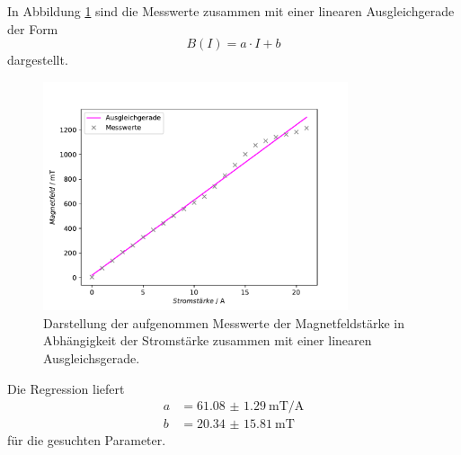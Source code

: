  In Abbildung \ref{fig:Magnetfeld} sind die Messwerte zusammen mit einer linearen Ausgleichgerade der 
 Form
 \begin{equation}
     B(I) = a \cdot I + b
 \end{equation} \noindent
 dargestellt.
 \begin{figure}[H]
     \centering
     \includegraphics[width=0.8\textwidth]{../Auswertung/Magnetfeld.pdf}
     \caption{Darstellung der aufgenommen Messwerte der Magnetfeldstärke in Abhängigkeit der Stromstärke zusammen 
     mit einer linearen Ausgleichsgerade.}
     \label{fig:Magnetfeld}
 \end{figure} \noindent
 Die Regression liefert 
 \begin{align}
     a &= \SI{61.08(129)}{\milli\tesla\per\ampere} \\
     b &= \SI{20.34(1581)}{\milli\tesla}
 \end{align} \noindent
 für die gesuchten Parameter. 

